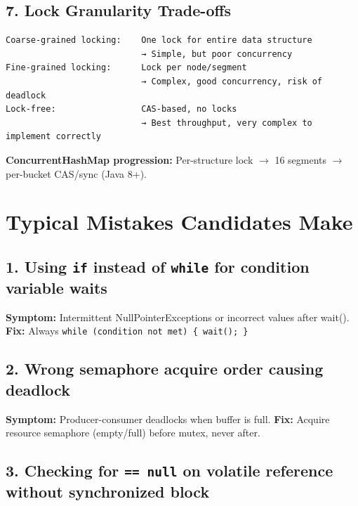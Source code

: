 \documentclass[11pt]{article}
\begin{document}
\subsection{7. Lock Granularity Trade-offs}\label{7-lock-granularity-trade-offs}

\setcodelang{}

\begin{verbatim}
Coarse-grained locking:    One lock for entire data structure
                           → Simple, but poor concurrency
Fine-grained locking:      Lock per node/segment
                           → Complex, good concurrency, risk of deadlock
Lock-free:                 CAS-based, no locks
                           → Best throughput, very complex to implement correctly
\end{verbatim}

\textbf{ConcurrentHashMap progression:} Per-structure lock \(\rightarrow\) 16 segments \(\rightarrow\) per-bucket CAS/sync (Java 8+).

\section{Typical Mistakes Candidates Make}\label{typical-mistakes-candidates-make}

\subsection{\texorpdfstring{1. Using \texttt{if} instead of \texttt{while} for condition variable waits}{1. Using if instead of while for condition variable waits}}\label{1-using-if-instead-of-while-for-condition-variable-waits}

\textbf{Symptom:} Intermittent NullPointerExceptions or incorrect values after wait(). \textbf{Fix:} Always \texttt{while\ (condition\ not\ met)\ \{\ wait();\ \}}

\subsection{2. Wrong semaphore acquire order causing deadlock}\label{2-wrong-semaphore-acquire-order-causing-deadlock}

\textbf{Symptom:} Producer-consumer deadlocks when buffer is full. \textbf{Fix:} Acquire resource semaphore (empty/full) before mutex, never after.

\subsection{\texorpdfstring{3. Checking for \texttt{==\ null} on volatile reference without synchronized block}{3. Checking for == null on volatile reference without synchronized block}}\label{3-checking-for--null-on-volatile-reference-without-synchronized-block}
\end{document}
